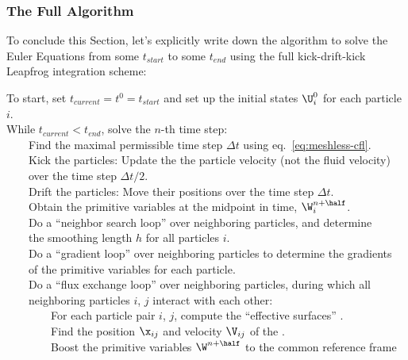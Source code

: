 \subsubsection{The Full Algorithm}

To conclude this Section, let's explicitly write down the algorithm to solve the Euler Equations
from some $t_{start}$ to some $t_{end}$ using the full kick-drift-kick Leapfrog integration scheme:

{
To start, set $t_{current} = t^0 = t_{start}$ and set up the initial states $\U_i^0$ for
each particle $i$.\\[.5em]
%
While $t_{current} < t_{end}$, solve the $n$-th time step:\\[.5em]
%
\indent~~~~Find the maximal permissible time step $\Delta t$ using
eq.~\ref{eq:meshless-cfl}.\\[.5em]
%
\indent~~~~Kick the particles: Update the the particle velocity (not the fluid velocity) \\
\indent~~~~over the time step $\Delta t / 2$.\\[.5em]
%
\indent~~~~Drift the particles: Move their positions over the time step $\Delta t$.\\[.5em]
%
\indent~~~~Obtain the primitive variables at the midpoint in time, $\W_i^{n+\half}$.\\[.5em]
%
\indent~~~~Do a ``neighbor search loop'' over neighboring particles, and determine\\
\indent~~~~the smoothing length $h$ for all particles $i$.\\[.5em]
%
\indent~~~~Do a ``gradient loop'' over neighboring particles to determine the gradients\\
\indent~~~~of the primitive variables for each particle.\\[.5em]
%
\indent~~~~Do a ``flux exchange loop'' over neighboring particles, during which all\\
\indent~~~~neighboring particles $i$, $j$ interact with each other:\\[.5em]
%
\indent~~~~~~~~For each particle pair $i$, $j$, compute the ``effective surfaces'' \Aij.\\[.5em]
%
\indent~~~~~~~~Find the position $\x_{ij}$ and velocity $\V_{ij}$ of the \Aij.\\[.5em]
%
\indent~~~~~~~~Boost the primitive variables $\W^{n+\half}$ to the common reference frame \\
}
